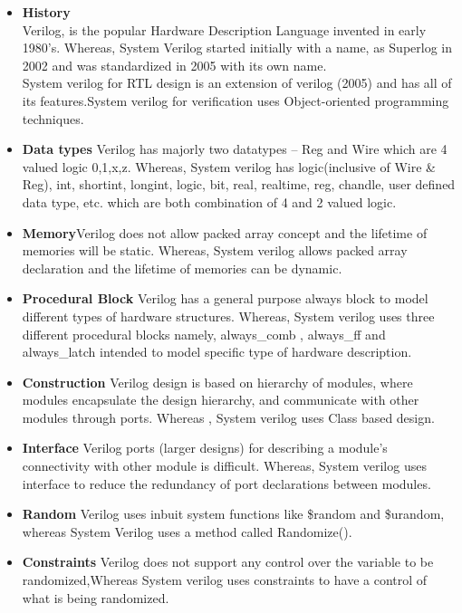 	
\begin{itemize}

    \item \textbf{History}\\ Verilog, is the popular Hardware Description Language invented in early 1980’s. Whereas, System Verilog started initially with a name, as Superlog in 2002 and was standardized in 2005 with its own name.\\
	System verilog for RTL design is an extension of verilog (2005) and has all of its features.System verilog for verification uses Object-oriented programming techniques.

	\item \textbf{Data types} Verilog has majorly two datatypes – Reg and Wire  which are 4 valued logic 0,1,x,z. Whereas, System verilog has logic(inclusive of Wire \& Reg),  int, shortint, longint, logic, bit, real, realtime, reg, chandle, user defined data type, etc. which are both combination of 4 and 2 valued logic.
	
	\item \textbf{Memory}Verilog does not allow packed array concept and the lifetime of memories will be static. Whereas, System verilog allows packed array declaration and the lifetime of memories can be dynamic.

	\item \textbf{Procedural Block} Verilog has a general purpose always block to model different types of hardware structures. Whereas, System verilog uses three different procedural blocks namely, always\_comb , always\_ff and always\_latch intended to model specific type of hardware description.

	\item \textbf{Construction} Verilog design is based on hierarchy of modules, where modules encapsulate the design hierarchy, and communicate with other modules through ports. Whereas , System verilog uses Class based design.

	\item \textbf{Interface} Verilog ports (larger designs) for describing a module’s connectivity with other module is difficult. Whereas, System verilog uses interface to reduce the redundancy of port declarations between modules.

	\item \textbf{Random} Verilog uses inbuit system functions like \$random and \$urandom, whereas System Verilog uses a method called Randomize().

	\item \textbf{Constraints} Verilog does not support any control over the variable to be randomized,Whereas System verilog uses constraints to have a control of what is being randomized.


\end{itemize}
